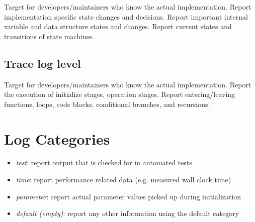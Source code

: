 Target for developers/maintainers who know the actual implementation.
Report implementation specific state changes and decisions. Report important
internal variable and data structure states and changes. Report current states
and transitions of state machines.

\subsection*{Trace log level}

Target for developers/maintainers who know the actual implementation.
Report the execution of initialize stages, operation stages. Report
entering/leaving functions, loops, code blocks, conditional branches, and
recursions.

\section{Log Categories}

\begin{itemize}
	\item \textit{test}: report output that is checked for in automated tests
	\item \textit{time}: report performance related data (e.g. measured wall clock
	time)
	\item \textit{parameter}: report actual parameter values picked up during
	initialization
	\item \textit{default (empty)}: report any other information using the default
	category
\end{itemize}
